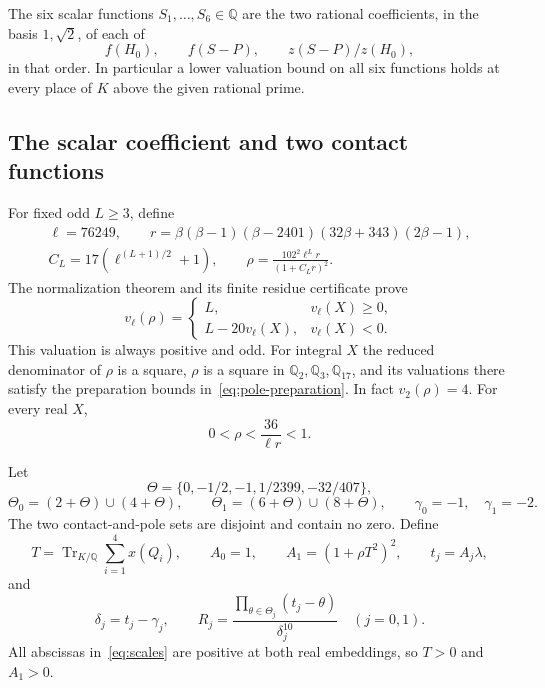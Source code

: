 \documentclass[11pt,a4paper]{article}
\newcommand{\Q}{\mathbb Q}\newcommand{\Z}{\mathbb Z}
\DeclareMathOperator{\Tr}{Tr}
\begin{document}
The six scalar functions $S_1,\ldots,S_6\in\Q$ are the two
rational coefficients, in the basis $1,\sqrt2$, of each of
\begin{equation}\label{eq:scalar-list}
 f(H_0),\qquad f(S-P),\qquad z(S-P)/z(H_0),
\end{equation}
in that order. In particular a lower valuation bound on all six
functions holds at every place of $K$ above the given rational prime.

\subsection{The scalar coefficient and two contact functions}

For fixed odd $L\ge3$, define
\begin{equation}\label{eq:scalar-coefficient}
 \begin{gathered}
 \ell=76249,\qquad
 r=\beta(\beta-1)(\beta-2401)(32\beta+343)(2\beta-1),\\
 C_L=17(\ell^{(L+1)/2}+1),\qquad
 \rho=\frac{102^2\ell^L r}{(1+C_Lr)^2}.
 \end{gathered}
\end{equation}
The normalization theorem and its finite residue certificate
\cite{Normalizer} prove
\begin{equation}\label{eq:forced}
 v_\ell(\rho)=
 \begin{cases}L,&v_\ell(X)\ge0,\\L-20v_\ell(X),&v_\ell(X)<0.
 \end{cases}
\end{equation}
This valuation is always positive and odd. For integral $X$ the
reduced denominator of $\rho$ is a square, $\rho$ is a square in
$\Q_2,\Q_3,\Q_{17}$, and its valuations there satisfy the
preparation bounds in~\eqref{eq:pole-preparation}. In fact
$v_2(\rho)=4$. For every real $X$,
\begin{equation}\label{eq:rho-small}
 0<\rho<\frac{36}{\ell r}<1.
\end{equation}

Let
\[
 \Theta=\{0,-1/2,-1,1/2399,-32/407\},
\]
\[
 \Theta_0=(2+\Theta)\cup(4+\Theta),\qquad
 \Theta_1=(6+\Theta)\cup(8+\Theta),\qquad
 \gamma_0=-1,\quad\gamma_1=-2.
\]
The two contact-and-pole sets are disjoint and contain no zero.
Define
\begin{equation}\label{eq:scales}
 T=\Tr_{K/\Q}\sum_{i=1}^4x(Q_i),\qquad
 A_0=1,\qquad A_1=(1+\rho T^2)^2,
 \qquad t_j=A_j\lambda,
\end{equation}
and
\begin{equation}\label{eq:contacts}
 \delta_j=t_j-\gamma_j,\qquad
 R_j=\frac{\prod_{\theta\in\Theta_j}(t_j-\theta)}{\delta_j^{10}}
 \quad(j=0,1).
\end{equation}
All abscissas in~\eqref{eq:scales} are positive at both real
embeddings, so $T>0$ and $A_1>0$.
\end{document}
